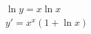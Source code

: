 \documentclass{book}
\begin{document}
\setcounter{chapter}{2}

\begin{gather}
\ln y = x \ln x \\
y' = x^{x}(1 + \ln x)
\end{gather}
\end{document}
